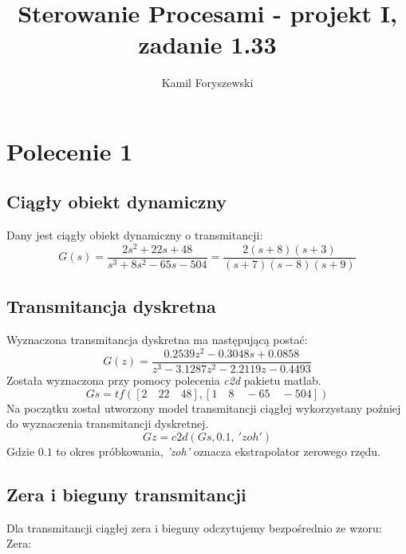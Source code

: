 \documentclass[a4paper, 11pt]{article}
\author{Kamil Foryszewski}
\title{Sterowanie Procesami - projekt I, zadanie 1.33}
\begin{document}

\maketitle
\tableofcontents

\section{Polecenie 1}

\subsection{Ciągły obiekt dynamiczny}
Dany jest ciągły obiekt dynamiczny o transmitancji: 
$$G(s) = \frac{2s^2+22s+48}{s^3+8s^2-65s-504} = \frac{2(s+8)(s+3)}{(s+7)(s-8)(s+9)}$$

\subsection{Transmitancja dyskretna}
Wyznaczona transmitancja dyskretna ma następującą postać: 
$$G(z) = \frac{0.2539z^2-0.3048s+0.0858}{z^3-3.1287z^2-2.2119z-0.4493}$$
Została wyznaczona przy pomocy polecenia \emph{c2d} pakietu matlab. 
$$Gs = tf([2\quad 22\quad 48], [1\quad 8\quad -65\quad -504])$$
Na początku został utworzony model transmitancji ciągłej wykorzystany poźniej do wyznaczenia transmitancji dyskretnej. 
$$Gz = c2d(Gs,0.1,\ 'zoh')$$
Gdzie $0.1$ to okres próbkowania, \emph{'zoh'} oznacza ekstrapolator zerowego rzędu. 
\subsection{Zera i bieguny transmitancji}
Dla transmitancji ciągłej zera i bieguny odczytujemy bezpośrednio ze wzoru:\\
Zera: \\
\end{document}
